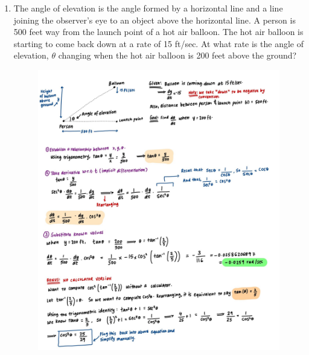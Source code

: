 \documentclass{article}
\begin{document}
\begin{enumerate}
    \pagebreak
    \item The angle of elevation is the angle formed by a horizontal line and a line joining the observer’s eye to an object above the horizontal line. A person is 500 feet way from the launch point of a hot air balloon. The hot air balloon is starting to come back down at a rate of 15 ft/sec. At what rate is the angle of elevation, $\theta$ changing when the hot air balloon is 200 feet above the ground? 

    \begin{figure}[H]
        \centering
        \includegraphics[width=0.98\linewidth]{Q5.jpg}
        \label{fig:Q5}
    \end{figure}
\end{enumerate}
\end{document}
